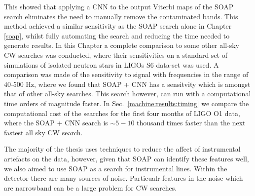 This showed that applying a \gls{CNN} to the output Viterbi maps of the SOAP search eliminates the need to manually remove the contaminated bands.
This method achieved a similar sensitivity as the SOAP search alone in Chapter \ref{soap}, whilst fully automating the search and reducing the time needed to generate results.
In this Chapter a complete comparison to some other all-sky \gls{CW} searches was conducted, where their sensitivities on a standard set of simulations of isolated neutron stars in \glspl{LIGO} S6 data-set was used.
A comparison was made of the sensitivity to signal with frequencies in the range of 40-500 Hz, where we found that SOAP + \gls{CNN} has a sensitvity which is amongst that of other all-sky searches.
This search however, can run with a computational time orders of magnitude faster. In Sec.~\ref{machine:results:timing} we compare the computational cost of the searches for the first four months of \gls{LIGO} O1 data, where the SOAP + \gls{CNN} search is $\sim 5 - 10$ thousand times faster than the next fastest all sky \gls{CW} search.

\bigskip

The majority of the thesis uses techniques to reduce the affect of instrumental artefacts on the data, however, given that SOAP can identify these features well, we also aimed to use SOAP as a search for instrumental lines.
Within the detector there are many sources of noise. 
Particualr features in the noise which are narrowband can be a large problem for \gls{CW} searches. 










